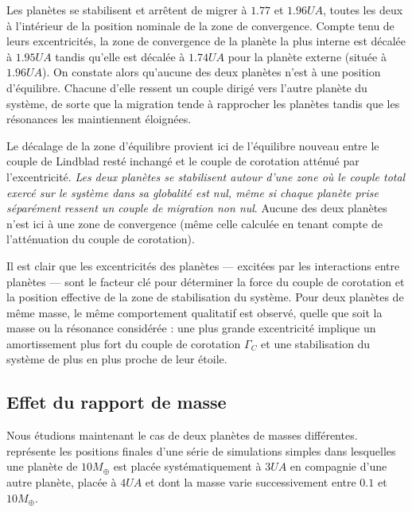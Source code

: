 Les planètes se stabilisent et arrêtent de migrer à $1.77$ et $1.96\unit{UA}$, toutes les deux à l'intérieur de la position nominale de la zone de convergence. Compte tenu de leurs excentricités, la zone de convergence de la planète la plus interne est décalée à $1.95\unit{UA}$ tandis qu'elle est décalée à $1.74\unit{UA}$ pour la planète externe (située à $1.96\unit{UA}$). On constate alors qu'aucune des deux planètes n'est à une position d'équilibre. Chacune d'elle ressent un couple dirigé vers l'autre planète du système, de sorte que la migration tende à rapprocher les planètes tandis que les résonances les maintiennent éloignées.

Le décalage de la zone d'équilibre provient ici de l'équilibre nouveau entre le couple de Lindblad resté inchangé et le couple de corotation atténué par l'excentricité. \emph{Les deux planètes se stabilisent autour d'une zone où le couple total exercé sur le système dans sa globalité est nul, même si chaque planète prise séparément ressent un couple de migration non nul}. Aucune des deux planètes n'est ici à une zone de convergence (même celle calculée en tenant compte de l'atténuation du couple de corotation). 

Il est clair que les excentricités des planètes --- excitées par les interactions entre planètes --- sont le facteur clé pour déterminer la force du couple de corotation et la position effective de la zone de stabilisation du système. Pour deux planètes de même masse, le même comportement qualitatif est observé, quelle que soit la masse ou la résonance considérée : une plus grande excentricité implique un amortissement plus fort du couple de corotation $\Gamma_C$ et une stabilisation du système de plus en plus proche de leur étoile. 

\subsection{Effet du rapport de masse}\label{sec:mass-ratio-effect}
Nous étudions maintenant le cas de deux planètes de masses différentes.  représente les
positions finales d'une série de simulations simples dans lesquelles une planète de $10\unit{M_\oplus}$ est placée
systématiquement à $3\unit{UA}$ en compagnie d'une autre planète, placée à $4\unit{UA}$ et dont la masse varie successivement
entre $0.1$ et $10\unit{M_\oplus}$. 

